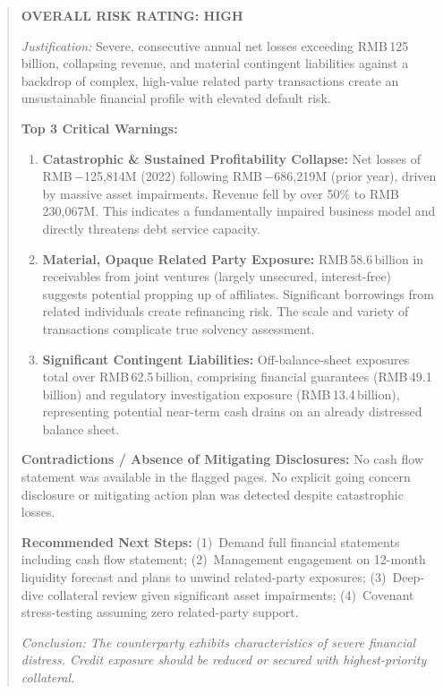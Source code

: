 \documentclass[12pt,a4paper]{article}
\begin{document}
\begin{quote}
\small
\textbf{OVERALL RISK RATING: HIGH}

\textit{Justification:} Severe, consecutive annual net losses exceeding
RMB\,125\,billion, collapsing revenue, and material contingent liabilities
against a backdrop of complex, high-value related party transactions create
an unsustainable financial profile with elevated default risk.

\textbf{Top 3 Critical Warnings:}

\begin{enumerate}
  \item \textbf{Catastrophic \& Sustained Profitability Collapse:}
    Net losses of RMB\,$-$125,814M (2022) following RMB\,$-$686,219M
    (prior year), driven by massive asset impairments. Revenue fell by
    over 50\% to RMB\,230,067M. This indicates a fundamentally impaired
    business model and directly threatens debt service capacity.

  \item \textbf{Material, Opaque Related Party Exposure:}
    RMB\,58.6\,billion in receivables from joint ventures (largely
    unsecured, interest-free) suggests potential propping up of affiliates.
    Significant borrowings from related individuals create refinancing risk.
    The scale and variety of transactions complicate true solvency assessment.

  \item \textbf{Significant Contingent Liabilities:}
    Off-balance-sheet exposures total over RMB\,62.5\,billion, comprising
    financial guarantees (RMB\,49.1\,billion) and regulatory investigation
    exposure (RMB\,13.4\,billion), representing potential near-term cash
    drains on an already distressed balance sheet.
\end{enumerate}

\textbf{Contradictions / Absence of Mitigating Disclosures:}
No cash flow statement was available in the flagged pages.
No explicit going concern disclosure or mitigating action plan was detected
despite catastrophic losses.

\textbf{Recommended Next Steps:}
(1)~Demand full financial statements including cash flow statement;
(2)~Management engagement on 12-month liquidity forecast and plans to
unwind related-party exposures;
(3)~Deep-dive collateral review given significant asset impairments;
(4)~Covenant stress-testing assuming zero related-party support.

\textit{Conclusion: The counterparty exhibits characteristics of severe
financial distress. Credit exposure should be reduced or secured with
highest-priority collateral.}
\end{quote}
\end{document}
